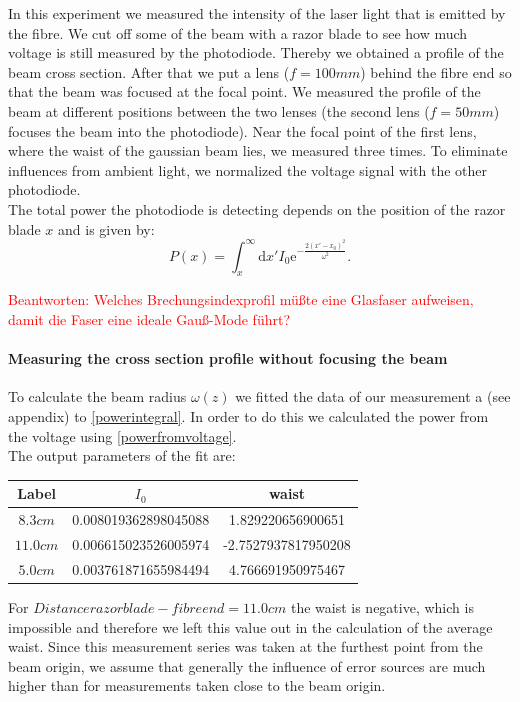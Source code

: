 \documentclass{article}
\begin{document}
In this experiment we measured the intensity of the laser light that is emitted by the fibre. We cut off some of the beam with a razor blade to see how much voltage is still measured by the photodiode. Thereby we obtained a profile of the beam cross section. After that we put a lens ($f=100mm$) behind the fibre end so that the beam was focused at the focal point. We measured the profile of the beam at different positions between the two lenses (the second lens ($f=50mm$) focuses the beam into the photodiode). Near the focal point of the first lens, where the waist of the gaussian beam lies, we measured three times. To eliminate influences from ambient light, we normalized the voltage signal with the other photodiode.\\

The total power the photodiode is detecting depends on the position of the razor blade $x$ and is given by:
\begin{equation}
P(x) = \int_x^\infty\mathrm{d}x' I_0 \mathrm{e}^{-\frac{2(x'-x_0)^2}{\omega^2}}.
\label{powerintegral}
\end{equation}

\textcolor{red}{Beantworten: Welches Brechungsindexprofil müßte eine Glasfaser aufweisen, damit die Faser eine ideale Gauß-Mode führt?}

\paragraph{Measuring the cross section profile without focusing the beam}

To calculate the beam radius $\omega (z)$ we fitted the data of our measurement a (see appendix) to \ref{powerintegral}. In order to do this we calculated the power from the voltage using \ref{powerfromvoltage}. \\

The output parameters of the fit are:

\begin{tabular}{ccc}
\hline
Label & $I_{0}$ & waist \\ 
\hline
$8.3cm$ & 0.008019362898045088 & 1.829220656900651 \\ 
\hline
$11.0 cm$ & 0.006615023526005974 & -2.7527937817950208 \\ 
\hline
$5.0cm$ & 0.003761871655984494 & 4.766691950975467 \\
\hline
\end{tabular}

 For $Distance razor blade - fibre end = 11.0 cm$ the waist is negative, which is impossible and therefore we left this value out in the calculation of the average waist. Since this measurement series was taken at the furthest point from the beam origin, we assume that generally the influence of error sources are much higher than for measurements taken close to the beam origin.\\
\end{document}
